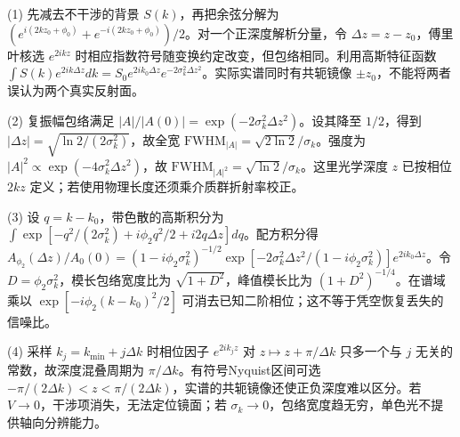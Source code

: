 (1) 先减去不干涉的背景 \(S(k)\)，再把余弦分解为 \((e^{i(2kz_0+\phi_0)}+e^{-i(2kz_0+\phi_0)})/2\)。对一个正深度解析分量，令 \(\Delta z=z-z_0\)，傅里叶核选 \(e^{2ikz}\) 时相应指数符号随变换约定改变，但包络相同。利用高斯特征函数 \(\int S(k)e^{2ik\Delta z}dk=S_0e^{2ik_0\Delta z}e^{-2\sigma_k^2\Delta z^2}\)。实际实谱同时有共轭镜像 \(\pm z_0\)，不能将两者误认为两个真实反射面。

(2) 复振幅包络满足 \(|A|/|A(0)|=\exp(-2\sigma_k^2\Delta z^2)\)。设其降至 \(1/2\)，得到 \(|\Delta z|=\sqrt{\ln2/(2\sigma_k^2)}\)，故全宽 \(\mathrm{FWHM}_{|A|}=\sqrt{2\ln2}/\sigma_k\)。强度为 \(|A|^2\propto\exp(-4\sigma_k^2\Delta z^2)\)，故 \(\mathrm{FWHM}_{|A|^2}=\sqrt{\ln2}/\sigma_k\)。这里光学深度 \(z\) 已按相位 \(2kz\) 定义；若使用物理长度还须乘介质群折射率校正。

(3) 设 \(q=k-k_0\)，带色散的高斯积分为 \(\int\exp[-q^2/(2\sigma_k^2)+i\phi_2q^2/2+i2q\Delta z]dq\)。配方积分得 \(A_{\phi_2}(\Delta z)/A_0(0)=(1-i\phi_2\sigma_k^2)^{-1/2}\exp[-2\sigma_k^2\Delta z^2/(1-i\phi_2\sigma_k^2)]e^{2ik_0\Delta z}\)。令 \(D=\phi_2\sigma_k^2\)，模长包络宽度比为 \(\sqrt{1+D^2}\)，峰值模长比为 \((1+D^2)^{-1/4}\)。在谱域乘以 \(\exp[-i\phi_2(k-k_0)^2/2]\) 可消去已知二阶相位；这不等于凭空恢复丢失的信噪比。

(4) 采样 \(k_j=k_{\min}+j\Delta k\) 时相位因子 \(e^{2ik_jz}\) 对 \(z\mapsto z+\pi/\Delta k\) 只多一个与 \(j\) 无关的常数，故深度混叠周期为 \(\pi/\Delta k\)。有符号Nyquist区间可选 \(-\pi/(2\Delta k)<z<\pi/(2\Delta k)\)，实谱的共轭镜像还使正负深度难以区分。若 \(V\to0\)，干涉项消失，无法定位镜面；若 \(\sigma_k\to0\)，包络宽度趋无穷，单色光不提供轴向分辨能力。
